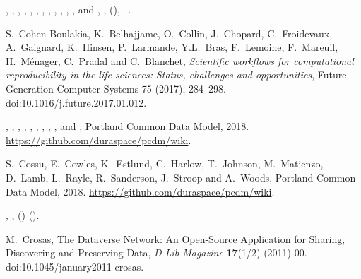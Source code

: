 \documentclass[ds,v1.1.2,openaccess]{iosart2x}%
\begin{document}
\begin{thebibliography}{}
%
\begin{barticle}
,
,
,
,
,
,
,
,
,
,
,
,
 and
,
,
(),
--.
\end{barticle}
%
\OrigBibText
S.~Cohen-Boulakia,
K.~Belhajjame,
O.~Collin,
J.~Chopard,
C.~Froidevaux,
A.~Gaignard,
K.~Hinsen,
P.~Larmande,
Y.L.~Bras,
F.~Lemoine,
F.~Mareuil,
H.~M\'{e}nager,
C.~Pradal and
C.~Blanchet,
\textit{Scientific workflows for computational reproducibility in the life
sciences: Status, challenges and opportunities},
Future Generation Computer Systems
75
(2017),
284--298.
doi:10.1016/j.future.2017.01.012.
\endOrigBibText
{}
\endbibitem

%
\begin{botherref}
,
,
,
,
,
,
,
,
,
 and
,
Portland Common Data Model,
2018.
\url{https://github.com/duraspace/pcdm/wiki}.
\end{botherref}
%
\OrigBibText
S.~Cossu,
E.~Cowles,
K.~Estlund,
C.~Harlow,
T.~Johnson,
M.~Matienzo,
D.~Lamb,
L.~Rayle,
R.~Sanderson,
J.~Stroop and
A.~Woods,
Portland Common Data Model,
2018.
\url{https://github.com/duraspace/pcdm/wiki}.
\endOrigBibText
{}
\endbibitem

%
\begin{barticle}
,
,
()
().
\end{barticle}
%
\OrigBibText
M.~Crosas,
The Dataverse Network: An Open-Source Application for Sharing,
Discovering and
Preserving Data,
\textit{D-Lib Magazine}
\textbf{17}(1/2)
(2011)
00.
doi:10.1045/january2011-crosas.
\endOrigBibText
{}
\endbibitem


\end{thebibliography}
\end{document}
